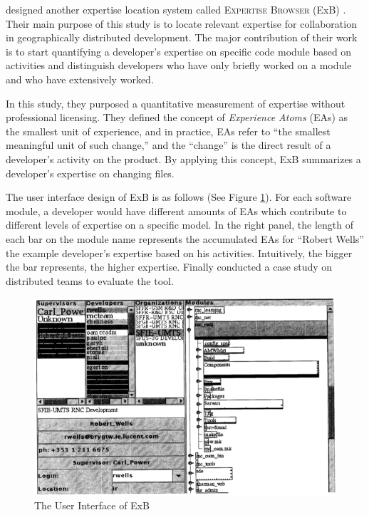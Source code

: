 \textbf{\citeauthor{mockus2002expertise} \citeyear{mockus2002expertise}}

\citeauthor{mockus2002expertise} designed another expertise location system called \textsc{Expertise Browser} (ExB) \cite{mockus2002expertise}. Their main purpose of this study is to locate relevant expertise for collaboration in geographically distributed development. The major contribution of their work is to start quantifying a developer's expertise on specific code module based on activities and distinguish developers who have only briefly worked on a module and who have extensively worked.

In this study, they purposed a quantitative measurement of expertise without professional licensing. They defined the concept of \textit{Experience Atoms} (EAs) as the smallest unit of experience, and in practice, EAs refer to ``the smallest meaningful unit of such change,'' and the ``change'' is the direct result of a developer's activity on the product. By applying this concept, ExB summarizes a developer's expertise on changing files.

The user interface design of ExB is as follows (See Figure \ref{ExB}). For each software module, a developer would have different amounts of EAs which contribute to different levels of expertise on a specific model. In the right panel, the length of each bar on the module name represents the accumulated EAs for ``Robert Wells'' the example developer's expertise based on his activities. Intuitively, the bigger the bar represents, the higher expertise. Finally \citeauthor{mockus2002expertise} conducted a case study on distributed teams to evaluate the tool.

\begin{figure}
\includegraphics[width = 0.8\columnwidth]{ExB.png}
\centering
\caption{The User Interface of ExB \cite{mockus2002expertise}}
\label{ExB}
\end{figure}

